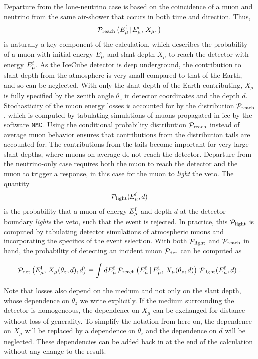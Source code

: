 Departure from the lone-neutrino case is based on the coincidence of a muon and neutrino from the same air-shower that occurs in both time and direction.
Thus,
\begin{equation}
\label{eq:preach}
{\mathcal P}_{\rm reach}\left(E_{\mu}^{\rm f} \, | \, E_{\mu}^{\rm i} , \, X_\mu, \right)
\end{equation}
is naturally a key component of the calculation, which describes the probability of a muon with initial energy $E_{\mu}^{\rm i}$ and slant depth $X_\mu$ to reach the detector with energy $E_{\mu}^{\rm f}$.
As the IceCube detector is deep underground, the contribution to slant depth from the atmosphere is very small compared to that of the Earth, and so can be neglected.
With only the slant depth of the Earth contributing, $X_\mu$ is fully specified by the zenith angle $\theta_z$ in detector coordinates and the depth $d$.
Stochasticity of the muon energy losses is accounted for by the distribution ${\mathcal P}_{\rm reach}$, which is computed by tabulating simulations of muons propagated in ice by the software $\texttt{MMC}$.
Using the conditional probability distribution ${\mathcal P}_{\rm reach}$ instead of average muon behavior ensures that contributions from the distribution tails are accounted for.
The contributions from the tails become important for very large slant depths, where muons on average do not reach the detector.
Departure from the neutrino-only case requires both the muon to reach the detector and the muon to trigger a response, in this case for the muon to {\it light} the veto.
The quantity
\begin{equation}
\label{eq:plight}
{\mathcal P}_{\rm light}(E_{\mu}^{\rm f},d)
\end{equation}
is the probability that a muon of energy $E_{\mu}^{\rm f}$ and depth $d$ at the detector boundary {\it lights} the veto, such that the event is rejected.
In practice, this ${\mathcal P}_{\rm light}$ is computed by tabulating detector simulations of atmospheric muons and incorporating the specifics of the event selection.
With both ${\mathcal P}_{\rm light}$ and ${\mathcal P}_{\rm reach}$ in hand, the probability of detecting an incident muon ${\mathcal P}_{\rm det}$ can be computed as 

\begin{equation}
\label{eq:PrPl}
{\mathcal P}_{\rm det}\left(E_{\mu}^{\rm i} , \, X_\mu(\theta_z, d), d\right) \equiv \int dE_{\mu}^{\rm f} \, {\mathcal P}_{\rm reach}\left(E_{\mu}^{\rm f} \, | \, E_{\mu}^{\rm i} , \, X_\mu(\theta_z, d)\right) \, {\mathcal P}_{\rm light} (E_{\mu}^{\rm f}, d) ~.
\end{equation}

Note that losses also depend on the medium and not only on the slant depth, whose dependence on $\theta_z$ we write explicitly. If the medium surrounding the detector is homogeneous, the dependence on $X_\mu$ can be exchanged for distance without loss of generality.
To simplify the notation from here on, the dependence on $X_\mu$ will be replaced by a dependence on $\theta_z$ and the dependence on $d$ will be neglected.
These dependencies can be added back in at the end of the calculation without any change to the result.

